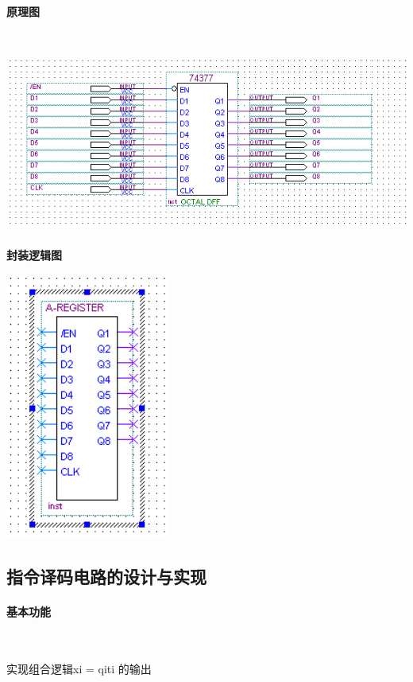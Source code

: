 \documentclass[UTF8]{ctexart}
\begin{document}
    \paragraph{原理图}

    ~

    \includegraphics[width=1.0\textwidth]{./img/寄存器A,B,R原理图.png}

    \paragraph{封装逻辑图}

    \includegraphics[width=0.4\textwidth]{./img/寄存器A,B,R封装逻辑图.png}

    \subsection{指令译码电路的设计与实现}
    \paragraph{基本功能}

    ~

    实现组合逻辑xi = qiti 的输出
\end{document}
